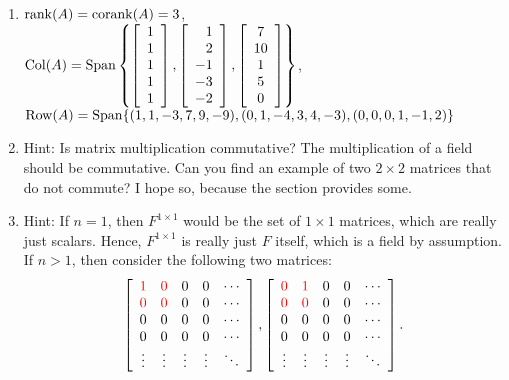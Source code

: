 \begin{enumerate}[!HW!, start=1]
\item $\rank(A)=\corank(A)=3$,\\
$\col(A)=\Span\left\{\vr{1\\1\\1\\1\\1},\vr{1\\2\\-1\\-3\\-2},\mtx{c}{7\\10\\1\\5\\0}\right\}$,\\
$\row(A)=\Span\{(1,1,-3,7,9,-9), (0,1,-4,3,4,-3), (0,0,0,1,-1,2)\}$

\item Hint: Is matrix multiplication commutative? The multiplication of a field should be commutative. Can you find an example of two $2\times 2$ matrices that do not commute? I hope so, because the section provides some.

\item Hint: If $n=1$, then $F^{1\times 1}$ would be the set of $1\times 1$ matrices, which are really just scalars. Hence, $F^{1\times 1}$ is really just $F$ itself, which is a field by assumption. If $n>1$, then consider the following two matrices:
\[\mtx{ccccc}{\color{red}1&\color{red}0&0&0&\cdots\\ \color{red}0&\color{red}0&0&0&\cdots\\0&0&0&0&\cdots \\0&0&0&0&\cdots \\ \vdots & \vdots & \vdots & \vdots & \ddots}, \mtx{ccccc}{\color{red}0&\color{red}1&0&0&\cdots\\ \color{red}0&\color{red}0&0&0&\cdots\\0&0&0&0&\cdots \\0&0&0&0&\cdots \\ \vdots & \vdots & \vdots & \vdots & \ddots}.\]
\end{enumerate}

\vspace{-15 pt}